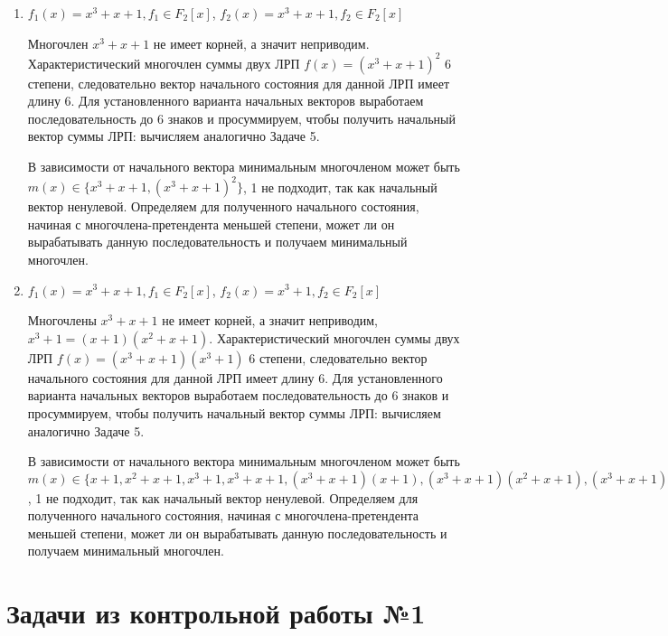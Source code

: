 \documentclass[utf8x, 14pt]{G7-32} %
\begin{document}
\begin{enumerate}
     \item $f_1(x) = x^3+x+1, f_1\in F_2[x]$, $f_2(x) = x^3+x+1, f_2\in F_2[x]$
    
     Многочлен $x^3+x+1$ не имеет корней, а значит неприводим. Характеристический многочлен суммы двух ЛРП $f(x) = (x^3+x+1)^2$ 6 степени, следовательно вектор начального состояния для данной ЛРП имеет длину 6. Для установленного варианта начальных векторов выработаем последовательность до 6 знаков и просуммируем, чтобы получить начальный вектор суммы ЛРП: вычисляем аналогично Задаче 5.
     
     В зависимости от начального вектора минимальным многочленом может быть $m(x)\in\{x^3+x+1, (x^3+x+1)^2\}$, 1 не подходит, так как начальный вектор ненулевой. Определяем для полученного начального состояния, начиная с многочлена-претендента меньшей степени, может ли он вырабатывать данную последовательность и получаем минимальный многочлен.
     
     \item $f_1(x) = x^3+x+1, f_1\in F_2[x]$, $f_2(x) = x^3+1, f_2\in F_2[x]$
    
     Многочлены $x^3+x+1$  не имеет корней, а значит неприводим, $x^3+1 = (x+1)(x^2+x+1)$. Характеристический многочлен суммы двух ЛРП $f(x) = (x^3+x+1)(x^3+1)$ 6 степени, следовательно вектор начального состояния для данной ЛРП имеет длину 6. Для установленного варианта начальных векторов выработаем последовательность до 6 знаков и просуммируем, чтобы получить начальный вектор суммы ЛРП: вычисляем аналогично Задаче 5.
     
     В зависимости от начального вектора минимальным многочленом может быть $m(x)\in\{x+1, x^2+x+1, x^3+1, x^3+x+1, (x^3+x+1)(x+1), (x^3+x+1)(x^2+x+1), (x^3+x+1)(x^3+1)\}$, 1 не подходит, так как начальный вектор ненулевой. Определяем для полученного начального состояния, начиная с многочлена-претендента меньшей степени, может ли он вырабатывать данную последовательность и получаем минимальный многочлен.
\end{enumerate}
\section{Задачи из контрольной работы №1}
\end{document}
